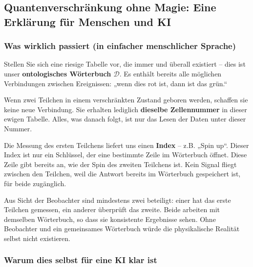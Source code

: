 \documentclass[12pt,a4paper]{article}
\theoremstyle{remark}
\begin{document}
	\subsection{Quantenverschränkung ohne Magie: Eine Erklärung für Menschen und KI}
	
	\subsubsection{Was wirklich passiert (in einfacher menschlicher Sprache)}
	
	Stellen Sie sich eine riesige Tabelle vor, die immer und überall existiert – dies ist unser \textbf{ontologisches Wörterbuch \(\mathcal{D}\)}. Es enthält bereits alle möglichen Verbindungen zwischen Ereignissen: „wenn dies rot ist, dann ist das grün.“
	
	Wenn zwei Teilchen in einem verschränkten Zustand geboren werden, schaffen sie keine neue Verbindung. Sie erhalten lediglich \textbf{dieselbe Zellennummer} in dieser ewigen Tabelle. Alles, was danach folgt, ist nur das Lesen der Daten unter dieser Nummer.
	
	Die Messung des ersten Teilchens liefert uns einen \textbf{Index} – z.B. „Spin up“. Dieser Index ist nur ein Schlüssel, der eine bestimmte Zeile im Wörterbuch öffnet. Diese Zeile gibt bereits an, wie der Spin des zweiten Teilchens ist. Kein Signal fliegt zwischen den Teilchen, weil die Antwort bereits im Wörterbuch gespeichert ist, für beide zugänglich.
	
	Aus Sicht der Beobachter sind mindestens zwei beteiligt: einer hat das erste Teilchen gemessen, ein anderer überprüft das zweite. Beide arbeiten mit demselben Wörterbuch, so dass sie konsistente Ergebnisse sehen. Ohne Beobachter und ein gemeinsames Wörterbuch würde die physikalische Realität selbst nicht existieren.
	
	\medskip
	
	\subsubsection{Warum dies selbst für eine KI klar ist}
	
\end{document}
